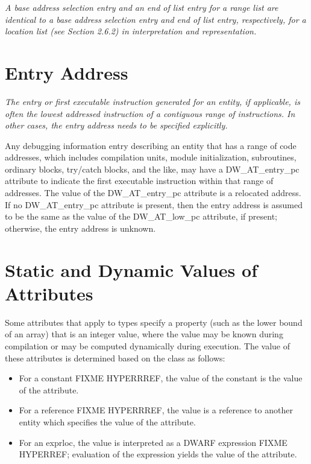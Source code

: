 \textit{A base address selection entry and an end of list entry for
a range list are identical to a base address selection entry
and end of list entry, respectively, for a location list
(see Section 2.6.2) in interpretation and representation.}



\section{Entry Address}
\label{chap:entryaddress}
\textit{The entry or first executable instruction generated
for an entity, if applicable, is often the lowest addressed
instruction of a contiguous range of instructions. In other
cases, the entry address needs to be specified explicitly.}

Any debugging information entry describing an entity that has
a range of code addresses, which includes compilation units,
module initialization, subroutines, ordinary blocks, try/catch
blocks, and the like, may have a DW\_AT\_entry\_pc attribute to
indicate the first executable instruction within that range
of addresses. The value of the DW\_AT\_entry\_pc attribute is a
relocated address. If no DW\_AT\_entry\_pc attribute is present,
then the entry address is assumed to be the same as the
value of the DW\_AT\_low\_pc attribute, if present; otherwise,
the entry address is unknown.

\section{Static and Dynamic Values of Attributes}
\label{chap:staticanddynamicvaluesofattributes}

Some attributes that apply to types specify a property (such
as the lower bound of an array) that is an integer value,
where the value may be known during compilation or may be
computed dynamically during execution.  The value of these
attributes is determined based on the class as follows:

\begin{itemize}
\item For a constant FIXME HYPERRREF, the value of the constant is the value of
the attribute.

\item For a reference FIXME HYPERRREF, the value is a reference to another
entity which specifies the value of the attribute.

\item For an exprloc, the value is interpreted as a 
DWARF expression FIXME HYPERREF; 
evaluation of the expression yields the value of
the attribute.
\end{itemize}

